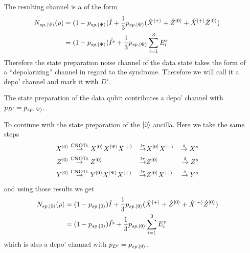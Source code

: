 The resulting channel is a of the form 
\begin{align*}
    N_{sp.\ket{\Psi}} (\rho) &= (1-p_{sp.\ket{\Psi}}) \hat{I} + \frac{1}{3}p_{sp.\ket{\Psi}}(\hat{X}^{\ket{+}} + \hat{Z}^{\ket{0}} + \hat{X}^{\ket{+}} \hat{Z}^{\ket{0}})\\
        &=  (1-p_{sp.\ket{\Psi}}) \hat{I^s} + \frac{1}{3} p_{sp.\ket{\Psi}}\sum_{i=1}^3 E_{i}^s\\
\end{align*}
Therefore the state preparation noise channel of the data state takes the form of a \enquote{depolarizing} channel in regard to the syndrome. 
Therefore we will call it a depo' channel and mark it with $D'$.

The state preparation of the data qubit contributes a depo' channel with $p_{D'} = p_{sp.\ket{\Psi}}$.

To continue with the state preparation of the $\ket{0}$ ancilla.
Here we take the same steps 
\begin{align*}
    X^{\ket{0}}  
    &\overset{\text{CNOTs}}{\rightarrow} X^{\ket{0}} X^{\ket{\Psi}} X^{\ket{+}}
    &\overset{tr}{\rightarrow} &X^{\ket{0}} X^{\ket{+}}
    &\overset{\tilde{s}}{\rightarrow} X^s  \\
    Z^{\ket{0}}  
    &\overset{\text{CNOTs}}{\rightarrow} Z^{\ket{0}} 
    &\overset{tr}{\rightarrow} & Z^{\ket{0}}   
    &\overset{\tilde{s}}{\rightarrow} Z^s  \\
    Y^{\ket{0}}  
    &\overset{\text{CNOTs}}{\rightarrow} Y^{\ket{0}} X^{\ket{\Psi}} X^{\ket{+}}
    &\overset{tr}{\rightarrow} & Z^{\ket{0}} X^{\ket{+}} 
    &\overset{\tilde{s}}{\rightarrow} Y^s  \\
\end{align*} 
and using those results we get 
\begin{align*}
    N_{sp.\ket{0}} (\rho) &= (1-p_{sp.\ket{0}}) \hat{I} + \frac{1}{3}p_{sp.\ket{0}}(\hat{X}^{\ket{+}} + \hat{Z}^{\ket{0}} + \hat{X}^{\ket{+}} \hat{Z}^{\ket{0}})\\
        &=  (1-p_{sp.\ket{0}}) \hat{I^s} + \frac{1}{3} p_{sp.\ket{0}}\sum_{i=1}^3 E_{i}^s\\
\end{align*}
which is also a depo' channel with $p_{D'} = p_{sp.\ket{0}}$.



